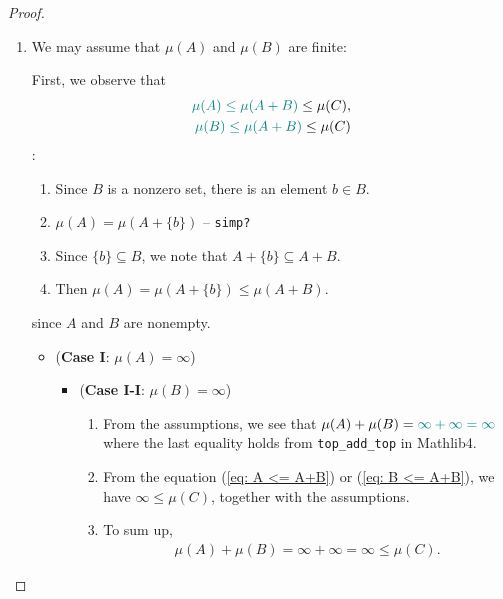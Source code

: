 \begin{proof}
    \begin{enumerate}
        \item We may assume that \(\mu(A)\) and \(\mu(B)\) are finite:

        First, we observe that
        \begin{eqnarray}
            {\color{teal}\mu(A) \leq \mu(A+B)} \leq \mu(C), \label{eq: A <= A+B}\\
            {\color{teal}\mu(B) \leq \mu(A+B)} \leq \mu(C) \label{eq: B <= A+B}
        \end{eqnarray}
        :\begin{enumerate}
            \item Since \(B\) is a nonzero set, there is an element \(b \in B\).
            \item \(\mu(A) =\mu(A+\{b\})\) -- \texttt{simp?}
            \item Since \(\{b\} \subseteq B\), we note that \(A + \{b\} \subseteq A + B\).
            \item Then \(\mu(A) = \mu(A + \{b\}) \leq \mu(A+B)\).
        \end{enumerate}
        since \(A\) and \(B\) are nonempty.
        \begin{itemize}
            \item (\textbf{Case I}: \(\mu(A)=\infty\))
            \begin{itemize}
                \item (\textbf{Case I-I}: \(\mu(B) = \infty\))
                \begin{enumerate}
                    \item From the assumptions, we see that \(\mu(A) + \mu(B) = {\color{teal}\infty + \infty = \infty}\) where the last equality holds from \texttt{top\_add\_top} in Mathlib4.
                    \item From the equation (\ref{eq: A <= A+B}) or (\ref{eq: B <= A+B}), we have \(\infty \leq \mu(C)\), together with the assumptions.
                    \item To sum up,
                    \begin{eqnarray*}
                        \mu(A) + \mu (B) = \infty + \infty = \infty \leq \mu(C).
                    \end{eqnarray*}
                \end{enumerate}


\end{itemize}
\end{itemize}
\end{enumerate}
\end{proof}
